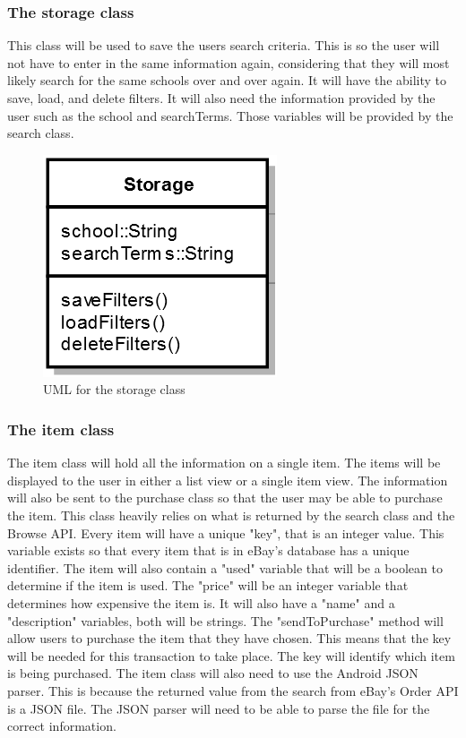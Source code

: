 \documentclass[journal,compsoc, 10pt, draftclsnofoot, onecolumn]{IEEEtran}
\begin{document}
\subsubsection*{The storage class}
This class will be used to save the users search criteria. This is so the user 
will not have to enter in the same information again, considering that they 
will most likely search for the same schools over and over again. It will have 
the ability to save, load, and delete filters. It will also need the information 
provided by the user such as the school and searchTerms. Those variables will be 
provided by the search class. 

\begin{figure}[h]
\centering
\caption{UML for the storage class}
\includegraphics[scale=.9]{storageUML}
\end{figure}
\FloatBarrier

\subsubsection*{The item class}
The item class will hold all the information on a single item. The items will be 
displayed to the user in either a list view or a single item view. The information 
will also be sent to the purchase class so that the user may be able to purchase 
the item. This class heavily relies on what is returned by the search class and 
the Browse API. Every item will have a unique "key", that is an integer value. This 
variable exists so that every item that is in eBay's database has a unique 
identifier. The item will also contain a "used" variable that will be a boolean 
to determine if the item is used. The "price" will be an integer variable that 
determines how expensive the item is. It will also have a "name" and a 
"description" variables,  both will be strings. The "sendToPurchase" method will 
allow users to purchase the item that they have chosen. This means that the key 
will be needed for this transaction to take place. The key will identify which 
item is being purchased. The item class will also need to use the Android JSON 
parser. This is because the returned value from the search from eBay's Order 
API is a JSON file. The JSON parser will need to be able to parse the file for the
correct information.
\end{document}
